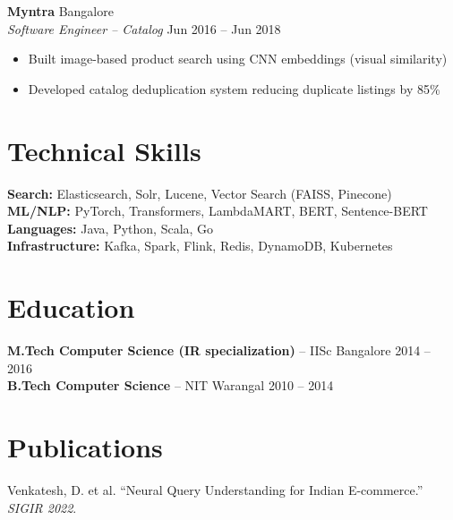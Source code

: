 \documentclass[10pt,letterpaper]{article}
\begin{document}
\textbf{Myntra} \hfill Bangalore\\
\textit{Software Engineer -- Catalog} \hfill Jun 2016 -- Jun 2018
\begin{itemize}
\item Built image-based product search using CNN embeddings (visual similarity)
\item Developed catalog deduplication system reducing duplicate listings by 85\%
\end{itemize}

\section{Technical Skills}
\textbf{Search:} Elasticsearch, Solr, Lucene, Vector Search (FAISS, Pinecone)\\
\textbf{ML/NLP:} PyTorch, Transformers, LambdaMART, BERT, Sentence-BERT\\
\textbf{Languages:} Java, Python, Scala, Go\\
\textbf{Infrastructure:} Kafka, Spark, Flink, Redis, DynamoDB, Kubernetes

\section{Education}
\textbf{M.Tech Computer Science (IR specialization)} -- IISc Bangalore \hfill 2014 -- 2016\\
\textbf{B.Tech Computer Science} -- NIT Warangal \hfill 2010 -- 2014

\section{Publications}
Venkatesh, D. et al. ``Neural Query Understanding for Indian E-commerce.'' \textit{SIGIR 2022}.
\end{document}
